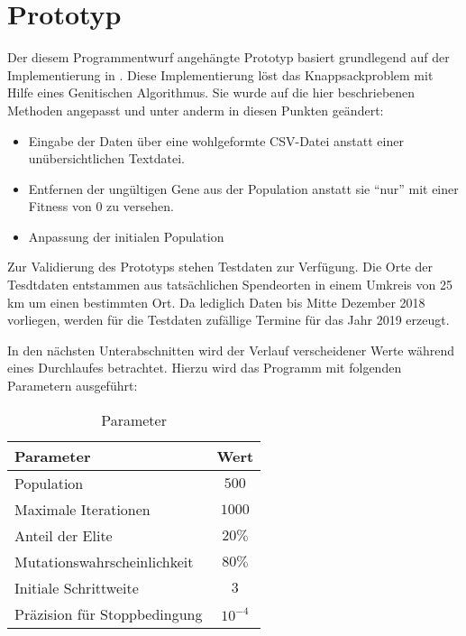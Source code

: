 \section{Prototyp}\label{sec:prototyp}

Der diesem Programmentwurf angehängte Prototyp basiert grundlegend auf der Implementierung in \cite{Quiz15Th91:online}.
Diese Implementierung löst das Knappsackproblem mit Hilfe eines Genitischen Algorithmus.
Sie wurde auf die hier beschriebenen Methoden angepasst und unter anderm
in diesen Punkten geändert:
\begin{itemize}
    \item Eingabe der Daten über eine wohlgeformte CSV-Datei anstatt einer unübersichtlichen Textdatei.
    \item Entfernen der ungültigen Gene aus der Population anstatt sie \enquote{nur} mit einer Fitness von $0$ zu versehen.
    \item Anpassung der initialen Population
\end{itemize}


\noindent
Zur Validierung des Prototyps stehen Testdaten zur Verfügung.
Die Orte der Tesdtdaten entstammen aus tatsächlichen Spendeorten in einem Umkreis von 25 km um einen bestimmten Ort.
Da lediglich Daten bis Mitte Dezember 2018 vorliegen,
werden für die Testdaten zufällige Termine für das Jahr 2019 erzeugt.

In den nächsten Unterabschnitten wird der Verlauf verscheidener Werte während eines Durchlaufes betrachtet.
Hierzu wird das Programm mit folgenden Parametern ausgeführt:
\begin{table}[ht]%
    \begin{center}
        \begin{tabular}{l|c}
            Parameter                       & Wert \\
            \hline
            Population                      & $500$  \\
            Maximale Iterationen            & $1000$ \\
            Anteil der Elite                & $20\%$ \\
            Mutationswahrscheinlichkeit     & $80\%$ \\
            Initiale Schrittweite           & $3$     \\
            Präzision für Stoppbedingung  & $10^{-4}$
        \end{tabular}
    \end{center}
    \caption{Parameter }
  \end{table}


